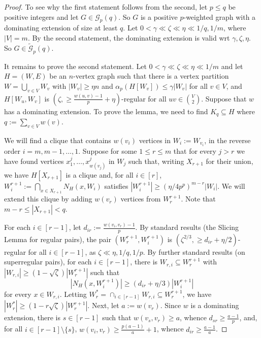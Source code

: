 \documentclass[10pt,a4paper]{article}
\theoremstyle{definition}
\def\eps{{\varepsilon}}
\newcommand{\cG}{\mathcal{G}}
\begin{document}
\begin{proof}
	To see why the first statement follows from the second, let $p \leq q$ be positive integers and
	let $G \in \cG_p(q)$. So $G$ is a positive $p$-weighted graph with a dominating extension of size at least $q$.
	Let $0 < \gamma \ll \zeta \ll \eta \ll 1/q,1/m$, where $|V|=m$.
	By the second statement, the dominating extension is valid wrt $\gamma,\zeta,\eta$. So $G \in \widetilde{\cG}_p(q)$.
	
	It remains to prove the second statement.
	Let $0 < \gamma \ll \zeta \ll \eta \ll 1/m$ and let $H = (W,E)$ be an $n$-vertex graph such that
	there is a vertex partition $W=\bigcup_{v \in V}W_v$ with $|W_v| \geq \eta n$ and $\alpha_p(H[W_v])\le \gamma|W_v|$ for all $v \in V$, and
	$H[W_u,W_v]$ is $(\zeta,\geq\!\frac{w(u,v)-1}{p}+\eta)$-regular for all $uv\in{V\choose 2}$.
	Suppose that $w$ has a dominating extension.
	To prove the lemma, we need to find $K_q \subseteq H$ where $q := \sum_{v \in V}w(v)$.
	
	
	We will find a clique that contains $w(v_i)$ vertices in $W_i:=W_{v_i}$, in the reverse order $i=m,m-1,\ldots,1$.
	Suppose for some $1 \leq r \leq m$ that for every $j > r$ we have found vertices $x_1^{j},\ldots,x_{w(v_j)}^j$ in $W_j$
	such that, writing $X_{r+1}$ for their union, we have $H[X_{r+1}]$ is a clique and, for all $i\in [r]$, $W_i^{r+1} := \bigcap_{x \in X_{r+1}}N_H(x,W_i)$ satisfies $|W_i^{r+1}| \geq (\eta/4p^p)^{m-r}|W_i|$.
	We will extend this clique by adding $w(v_r)$ vertices from $W_r^{r+1}$.
	Note that $m-r \leq |X_{r+1}| < q$.
	
	For each $i \in [r-1]$, let $d_{ir} := \frac{w(v_i,v_r)-1}{p}$.
	By standard results (the Slicing Lemma for regular pairs), the pair $(W_r^{r+1},W_i^{r+1})$ is $(\zeta^{2/3},\geq\!d_{ir}+\eta/2)$-regular for all $i \in [r-1]$, as $\zeta \ll \eta,1/q,1/p$.
	By further standard results (on superregular pairs), for each $i \in [r-1]$, there is $W_{r,i} \subseteq W_r^{r+1}$   
	with $|W_{r,i}| \geq (1-\sqrt{\zeta})|W_r^{r+1}|$ such that
	$$
	|N_H(x,W_i^{r+1})| \geq (d_{ir}+\eta/3)|W_i^{r+1}| %
	$$
	for every $x \in W_{r,i}$.
	Letting $W_r^*=\cap_{i\in[r-1]}W_{r,i} \subseteq W_r^{r+1}$, we have  $|W_r^*| \geq (1-r\sqrt{\zeta})|W_r^{r+1}|$. 
	Next, let $a:= w(v_r)$. 
	Since $w$ is a dominating extension, there is $s \in [r-1]$ such that $w(v_s,v_r) \geq a$, whence $d_{sr} \geq \frac{a-1}{p}$, and, for all $i \in [r-1]\setminus\lbrace s\rbrace$, $w(v_i,v_r) \geq \frac{p(a-1)}{a}+1$, whence $d_{ir}\ge \frac{a-1}{a}$.
	

\end{proof}
\end{document}
